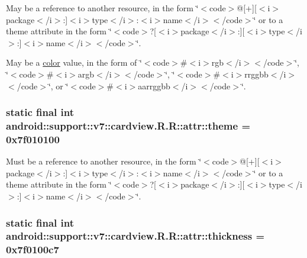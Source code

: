 May be a reference to another resource, in the form \char`\"{}$<$code$>$@\mbox{[}+\mbox{]}\mbox{[}$<$i$>$package$<$/i$>$:\mbox{]}$<$i$>$type$<$/i$>$:$<$i$>$name$<$/i$>$$<$/code$>$\char`\"{} or to a theme attribute in the form \char`\"{}$<$code$>$?\mbox{[}$<$i$>$package$<$/i$>$:\mbox{]}\mbox{[}$<$i$>$type$<$/i$>$:\mbox{]}$<$i$>$name$<$/i$>$$<$/code$>$\char`\"{}. 

May be a \hyperlink{classandroid_1_1support_1_1v7_1_1cardview_1_1_r_1_1color}{color} value, in the form of \char`\"{}$<$code$>$\#$<$i$>$rgb$<$/i$>$$<$/code$>$\char`\"{}, \char`\"{}$<$code$>$\#$<$i$>$argb$<$/i$>$$<$/code$>$\char`\"{}, \char`\"{}$<$code$>$\#$<$i$>$rrggbb$<$/i$>$$<$/code$>$\char`\"{}, or \char`\"{}$<$code$>$\#$<$i$>$aarrggbb$<$/i$>$$<$/code$>$\char`\"{}. \hypertarget{classandroid_1_1support_1_1v7_1_1cardview_1_1_r_1_1attr_24bcabf15e41a5e3c118342889da52c1}{
\subsubsection[{theme}]{\setlength{\rightskip}{0pt plus 5cm}static final int android::support::v7::cardview.R.R::attr::theme = 0x7f010100}}
\label{classandroid_1_1support_1_1v7_1_1cardview_1_1_r_1_1attr_24bcabf15e41a5e3c118342889da52c1}


Must be a reference to another resource, in the form \char`\"{}$<$code$>$@\mbox{[}+\mbox{]}\mbox{[}$<$i$>$package$<$/i$>$:\mbox{]}$<$i$>$type$<$/i$>$:$<$i$>$name$<$/i$>$$<$/code$>$\char`\"{} or to a theme attribute in the form \char`\"{}$<$code$>$?\mbox{[}$<$i$>$package$<$/i$>$:\mbox{]}\mbox{[}$<$i$>$type$<$/i$>$:\mbox{]}$<$i$>$name$<$/i$>$$<$/code$>$\char`\"{}. \hypertarget{classandroid_1_1support_1_1v7_1_1cardview_1_1_r_1_1attr_6ff38ec7bbb4e0f8e0c8d053f7224b53}{
\subsubsection[{thickness}]{\setlength{\rightskip}{0pt plus 5cm}static final int android::support::v7::cardview.R.R::attr::thickness = 0x7f0100c7}}
\label{classandroid_1_1support_1_1v7_1_1cardview_1_1_r_1_1attr_6ff38ec7bbb4e0f8e0c8d053f7224b53}


